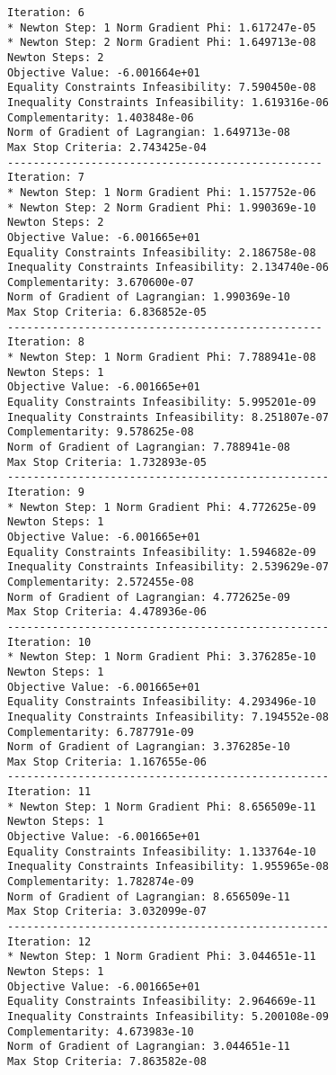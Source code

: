 \documentclass{article}
\begin{document}
\begin{minipage}[t]{0.45\textwidth}
\begin{verbatim}
Iteration: 6
* Newton Step: 1 Norm Gradient Phi: 1.617247e-05
* Newton Step: 2 Norm Gradient Phi: 1.649713e-08
Newton Steps: 2
Objective Value: -6.001664e+01
Equality Constraints Infeasibility: 7.590450e-08
Inequality Constraints Infeasibility: 1.619316e-06
Complementarity: 1.403848e-06
Norm of Gradient of Lagrangian: 1.649713e-08
Max Stop Criteria: 2.743425e-04
-------------------------------------------------
Iteration: 7
* Newton Step: 1 Norm Gradient Phi: 1.157752e-06
* Newton Step: 2 Norm Gradient Phi: 1.990369e-10
Newton Steps: 2
Objective Value: -6.001665e+01
Equality Constraints Infeasibility: 2.186758e-08
Inequality Constraints Infeasibility: 2.134740e-06
Complementarity: 3.670600e-07
Norm of Gradient of Lagrangian: 1.990369e-10
Max Stop Criteria: 6.836852e-05
-------------------------------------------------
Iteration: 8
* Newton Step: 1 Norm Gradient Phi: 7.788941e-08
Newton Steps: 1
Objective Value: -6.001665e+01
Equality Constraints Infeasibility: 5.995201e-09
Inequality Constraints Infeasibility: 8.251807e-07
Complementarity: 9.578625e-08
Norm of Gradient of Lagrangian: 7.788941e-08
Max Stop Criteria: 1.732893e-05
--------------------------------------------------
Iteration: 9
* Newton Step: 1 Norm Gradient Phi: 4.772625e-09
Newton Steps: 1
Objective Value: -6.001665e+01
Equality Constraints Infeasibility: 1.594682e-09
Inequality Constraints Infeasibility: 2.539629e-07
Complementarity: 2.572455e-08
Norm of Gradient of Lagrangian: 4.772625e-09
Max Stop Criteria: 4.478936e-06
--------------------------------------------------
Iteration: 10
* Newton Step: 1 Norm Gradient Phi: 3.376285e-10
Newton Steps: 1
Objective Value: -6.001665e+01
Equality Constraints Infeasibility: 4.293496e-10
Inequality Constraints Infeasibility: 7.194552e-08
Complementarity: 6.787791e-09
Norm of Gradient of Lagrangian: 3.376285e-10
Max Stop Criteria: 1.167655e-06
--------------------------------------------------
Iteration: 11
* Newton Step: 1 Norm Gradient Phi: 8.656509e-11
Newton Steps: 1
Objective Value: -6.001665e+01
Equality Constraints Infeasibility: 1.133764e-10
Inequality Constraints Infeasibility: 1.955965e-08
Complementarity: 1.782874e-09
Norm of Gradient of Lagrangian: 8.656509e-11
Max Stop Criteria: 3.032099e-07
--------------------------------------------------
Iteration: 12
* Newton Step: 1 Norm Gradient Phi: 3.044651e-11
Newton Steps: 1
Objective Value: -6.001665e+01
Equality Constraints Infeasibility: 2.964669e-11
Inequality Constraints Infeasibility: 5.200108e-09
Complementarity: 4.673983e-10
Norm of Gradient of Lagrangian: 3.044651e-11
Max Stop Criteria: 7.863582e-08
\end{verbatim}

\end{minipage}
\end{document}
